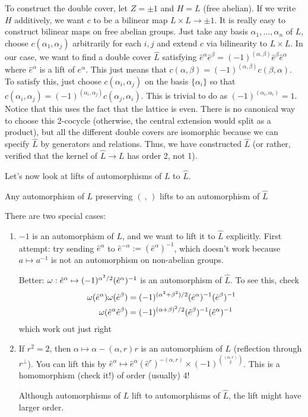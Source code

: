  To construct the double cover, let $Z=\pm 1$ and $H=L$ (free abelian). If we write
 $H$ additively, we want $c$ to be a bilinear map $L\times L \to \pm 1$. It is really
 easy to construct bilinear maps on free abelian groups. Just take any basis
 $\alpha_1,\dots, \alpha_n$ of $L$, choose $c(\alpha_1,\alpha_j)$ arbitrarily for each $i,j$
 and extend $c$ via bilinearity to $L\times L$. In our case, we want to find a double
 cover $\hat L$ satisfying $\hat e^\alpha \hat e^\beta = (-1)^{(\alpha,\beta)} \hat
 e^\beta \hat e^\alpha$ where $\hat e^\alpha$ is a lift of $e^\alpha$. This just means
 that $c(\alpha,\beta) = (-1)^{(\alpha,\beta)} c(\beta,\alpha)$. To satisfy this, just
 choose $c(\alpha_i,\alpha_j)$ on the basis $\{\alpha_i\}$ so that
 $c(\alpha_i,\alpha_j) = (-1)^{(\alpha_i,\alpha_j)} c(\alpha_j,\alpha_i)$. This is
 trivial to do as $(-1)^{(\alpha_i,\alpha_i)}=1$. Notice that this uses the fact that
 the lattice is even. There is no canonical way to choose this 2-cocycle (otherwise,
 the central extension would split as a product), but all the different double covers
 are isomorphic because we can specify $\hat L$ by generators and relations. Thus, we
 have constructed $\hat L$ (or rather, verified that the kernel of $\hat L \to L$ has
 order 2, not 1).

 Let's now look at lifts of automorphisms of $L$ to $\hat L$.
 \begin{exercise}
 Any automorphism of $L$ preserving $(\ ,\,)$ lifts to an automorphism
 of $\hat L$
 \end{exercise}
 There are two special cases:
 \begin{enumerate}
   \item $-1$ is an automorphism of $L$, and we want to lift it to $\hat L$
   explicitly. First attempt: try sending $\hat e^\alpha$ to $\hat e^{-\alpha}:=(\hat
   e^\alpha)^{-1}$, which doesn't work because $a\mapsto a^{-1}$ is not an
   automorphism on non-abelian groups.

   Better: $\omega: \hat e^\alpha \mapsto (-1)^{\alpha^2/2}(\hat e^\alpha)^{-1}$ is an
   automorphism of $\hat L$. To see this, check
   \begin{align*}
     \omega(\hat e^\alpha) \omega(\hat e^\beta) &= (-1)^{(\alpha^2+\beta^2)/2}(\hat
     e^\alpha)^{-1}(\hat e^\beta)^{-1}\\
     \omega(\hat e^\alpha \hat e^\beta) &= (-1)^{(\alpha+\beta)^2/2} (\hat e^\beta)^{-1}
     (\hat e^\alpha)^{-1}
   \end{align*}
   which work out just right

   \item If $r^2=2$, then $\alpha\mapsto \alpha - (\alpha,r)r$ is an automorphism of
   $L$ (reflection through $r^\perp$). You can lift this by $\hat e^\alpha \mapsto
   \hat e^\alpha (\hat e^r)^{-(\alpha,r)} \times (-1)^{\binom{(\alpha,r)}{2}}$. This
   is a homomorphism (check it!) of order (usually) 4!
   \begin{remark}
     Although automorphisms of $L$ lift to automorphisms of $\hat L$, the lift might
     have larger order.
   \end{remark}
 \end{enumerate}

